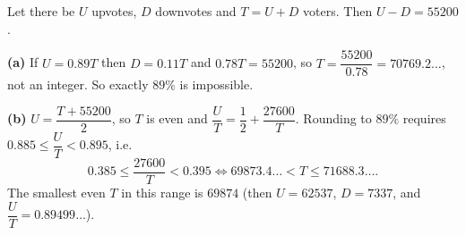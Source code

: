 Let there be $U$ upvotes, $D$ downvotes and $T=U+D$ voters. Then $U-D=55200$.

\textbf{(a)} If $U=0.89T$ then $D=0.11T$ and $0.78T=55200$, so $T=\dfrac{55200}{0.78}=70769.2\ldots$, not an integer. So exactly $89\%$ is impossible.

\textbf{(b)} $U=\dfrac{T+55200}{2}$, so $T$ is even and $\dfrac UT=\dfrac12+\dfrac{27600}{T}$. Rounding to $89\%$ requires $0.885\le\dfrac UT<0.895$, i.e.
\[0.385\le\dfrac{27600}{T}<0.395\iff69873.4\ldots<T\le71688.3\ldots.\]
The smallest even $T$ in this range is $\boxed{69874}$ (then $U=62537$, $D=7337$, and $\dfrac UT=0.89499\ldots$).
